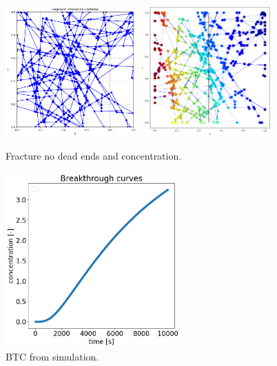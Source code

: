 \documentclass{article}
\begin{document}
\begin{figure}[htbp!]
    \centering
    \includegraphics[width=0.45\textwidth]{images/fractures2D/fractureNoDeadEnds.png}
    \hspace{0.05\textwidth}
    \includegraphics[width=0.45\textwidth]{images/fractures2D/fractureConcentration.png}
    \caption{Fracture no dead ends and concentration.}
    \label{fig:FracConc}
\end{figure}
\begin{figure}[htbp]
    \centering
    \includegraphics[width=0.6\textwidth]{images/fractures2D/fractureBTC.png}
    \caption{BTC from simulation.}
    \label{fig:FracBTC}
\end{figure}
\end{document}
